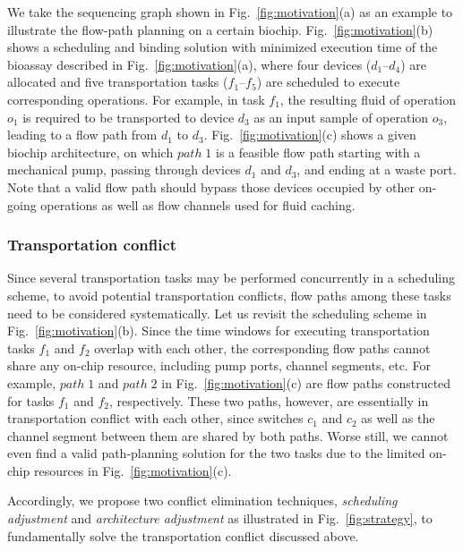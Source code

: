 We take the sequencing graph shown in Fig.~\ref{fig:motivation}(a) as an example to illustrate the flow-path planning on a certain biochip. Fig.~\ref{fig:motivation}(b) shows a scheduling and binding solution with minimized execution time of the bioassay described in Fig.~\ref{fig:motivation}(a), where four devices ($d_1$--$d_4$) are allocated and five transportation tasks ($f_1$--$f_5$) are scheduled to execute corresponding operations. For example, in task $f_1$, the resulting fluid of operation $o_1$ is required to be transported to device $d_3$ as an input sample of operation $o_3$, leading to a flow path from $d_1$ to $d_3$. Fig.~\ref{fig:motivation}(c) shows a given biochip architecture, on which $path\;1$ is a feasible flow path starting with a mechanical pump, passing through devices $d_1$ and $d_3$, and ending at a waste port. Note that a valid flow path should bypass those devices  occupied by other on-going operations as well as flow channels used for fluid caching.



\subsubsection{Transportation conflict}

Since several transportation tasks may be performed concurrently in a scheduling scheme,
to avoid potential transportation conflicts, flow paths among these tasks need to be considered systematically. Let us revisit the scheduling scheme in Fig.~\ref{fig:motivation}(b). Since the time windows for executing transportation tasks $f_1$ and $f_2$ overlap with each other, the corresponding flow paths cannot share any on-chip resource, including pump ports, channel segments, etc. For example, $path\;1$ and $path\;2$ in Fig.~\ref{fig:motivation}(c) are flow paths constructed for tasks $f_1$ and $f_2$, respectively. These two paths, however, are essentially in transportation conflict with each other, since switches $c_1$ and $c_2$ as well as the channel segment between them are shared by both paths. Worse still, we cannot even find a valid path-planning solution for the two tasks due to the limited on-chip resources in Fig.~\ref{fig:motivation}(c).

Accordingly, we propose two conflict elimination techniques, \textsl{scheduling adjustment} and \textsl{architecture adjustment} as illustrated in Fig.~\ref{fig:strategy}, to fundamentally solve the transportation conflict discussed above. %


